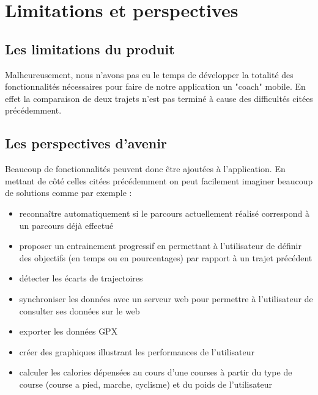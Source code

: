 \chapter{Limitations et perspectives}
\section{Les limitations du produit}
Malheureusement, nous n'avons pas eu le temps de développer la totalité des fonctionnalités nécessaires pour faire de notre application un "coach" mobile. En effet la comparaison de deux trajets n'est pas terminé à cause des difficultés citées précédemment. 


\section{Les perspectives d'avenir}
Beaucoup de fonctionnalités peuvent donc être ajoutées à l'application. En mettant de côté celles citées précédemment on peut facilement imaginer beaucoup de solutions comme par exemple : \bigskip
\begin{itemize}
	\item reconnaître automatiquement si le parcours actuellement réalisé correspond à un parcours déjà effectué
	\item proposer un entrainement progressif en permettant à l'utilisateur de définir des objectifs (en temps ou en pourcentages) par rapport à un trajet précédent
	\item détecter les écarts de trajectoires
	\item synchroniser les données avec un serveur web pour permettre à l'utilisateur de consulter ses données sur le web
	\item exporter les données GPX
	\item créer des graphiques illustrant les performances de l'utilisateur
	\item calculer les calories dépensées au cours d'une courses à partir du type de course (course a pied, marche, cyclisme) et du poids de l'utilisateur
\end{itemize}
